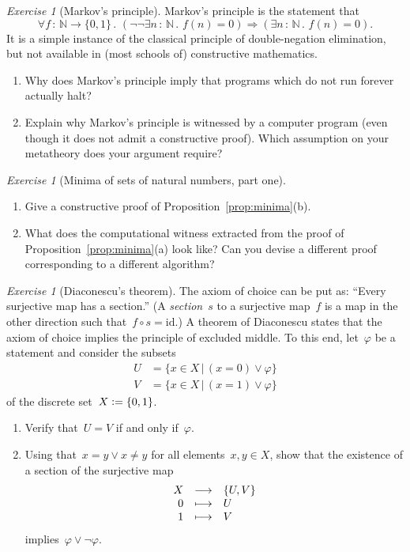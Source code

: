 \documentclass[10pt,reqno,a4paper,openany]{amsbook}
\theoremstyle{definition}
\theoremstyle{plain}
\theoremstyle{remark}
\newcommand{\NN}{\mathbb{N}}
\newcommand{\?}{\,{:}\,}
\renewcommand{\_}{\mathpunct{.}\,}
\newcommand{\defeq}{\vcentcolon=}
\newtheorem{exercise}[defn]{Exercise}
\begin{document}
\begin{exercise}[Markov's principle]\label{ex:markov}
Markov's principle is the statement that
\[ \forall f \? \NN \to \{0,1\}\_ (\neg\neg\exists n \? \NN\_ f(n) = 0)
\Rightarrow (\exists n \? \NN\_ f(n) = 0). \]
It is a simple instance of the classical principle of double-negation
elimination, but not available in (most schools of) constructive mathematics.
\begin{enumerate}
\item Why does Markov's principle imply that programs which do not run forever
actually halt?
\item Explain why Markov's principle is witnessed by a computer program (even
though it does not admit a constructive proof). Which assumption on your
metatheory does your argument require?
\end{enumerate}
\end{exercise}

\begin{exercise}[Minima of sets of natural numbers, part one]\label{ex:minima1}
\begin{enumerate}
\item Give a constructive proof of Proposition~\ref{prop:minima}(b).
\item What does the computational witness extracted from the proof of
Proposition~\ref{prop:minima}(a) look like? Can you devise a different proof
corresponding to a different algorithm?
\end{enumerate}
\end{exercise}

\begin{exercise}[Diaconescu's theorem]
\label{ex:diaconescu}
The axiom of choice can be put as: ``Every surjective map has a
section.'' (A \emph{section}~$s$ to a surjective map~$f$ is a map in the other direction such that~$f \circ s =
\mathrm{id}$.) A theorem of Diaconescu states that
the axiom of choice implies the principle of excluded middle. To this end, let~$\varphi$ be a
statement and consider the subsets
\begin{align*}
  U &= \{ x \in X \,|\, (x = 0) \vee \varphi \} \\
  V &= \{ x \in X \,|\, (x = 1) \vee \varphi \}
\end{align*}
of the discrete set~$X \defeq \{ 0,1 \}$.
\begin{enumerate}
\item Verify that~$U = V$ if and only if~$\varphi$.
\item Using that~$x = y \vee x \neq y$ for all elements~$x,y \in X$, show that
the existence of a section of the surjective map
\[ \begin{array}{@{}rcl@{}}
  X &\longrightarrow& \{U,V\} \\
  0 &\longmapsto& U \\
  1 &\longmapsto& V
\end{array} \]
implies~$\varphi \vee \neg\varphi$.
\end{enumerate}
\end{exercise}
\end{document}
